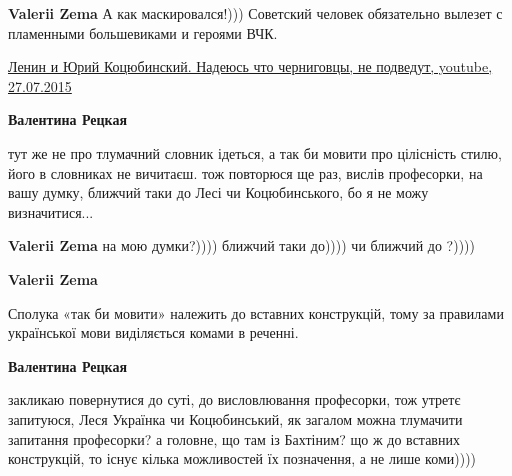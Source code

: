 \begin{itemize}
\begin{itemize}
\textbf{Valerii Zema} А как маскировался!))) Советский человек обязательно вылезет с пламенными большевиками и героями ВЧК.

\href{https://www.youtube.com/watch?v=uAoCiq7HFzU}{%
Ленин и Юрий Коцюбинский. Надеюсь что черниговцы, не подведут, youtube, 27.07.2015%
}

 
\textbf{Валентина Рецкая} 

тут же не про тлумачний словник ідеться, а так би мовити про цілісність стилю,
його в словниках не вичитаєш. тож повторюся ще раз, вислів професорки, на вашу
думку, ближчий таки до Лесі чи Коцюбинського, бо я не можу визначитися...

 
\textbf{Valerii Zema} на мою думки?)))) ближчий таки до)))) чи ближчий до ?))))

 
\textbf{Valerii Zema} 

Сполука «так би мовити» належить до вставних конструкцій, тому за правилами
української мови виділяється комами в реченні.

 
\textbf{Валентина Рецкая} 

закликаю повернутися до суті, до висловлювання професорки, тож утретє
запитуюся, Леся Українка чи Коцюбинський, як загалом можна тлумачити запитання
професорки? а головне, що там із Бахтіним? що ж до вставних конструкцій, то
існує кілька можливостей їх позначення, а не лише коми))))

 

\end{itemize}
\end{itemize}
